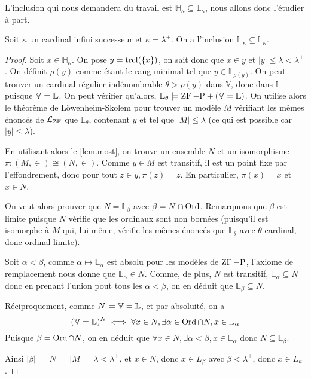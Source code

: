 L'inclusion qui nous demandera du travail est
$\mathbb H_\kappa \subseteq\mathbb L_\kappa$, nous allons donc l'étudier à part.

\begin{lemma}
  Soit $\kappa$ un cardinal infini successeur et $\kappa = \lambda^+$. On a
  l'inclusion $\mathbb H_\kappa \subseteq \mathbb L_\kappa$.
\end{lemma}

\begin{proof}
  Soit $x \in \mathbb H_\kappa$. On pose $y = \operatorname{trcl}(\{x\})$, on sait donc que
  $x \in y$ et $|y| \leq \lambda < \lambda^+$. On définit $\rho(y)$ comme étant
  le rang minimal tel que $y\in\mathbb L_{\rho(y)}$. On peut trouver un cardinal
  régulier indénombrable $\theta > \rho(y)$ dans $\mathbb V$, donc dans
  $\mathbb L$ puisque $\mathbb V = \mathbb L$. On peut vérifier qu'alors,
  $\mathbb L_{\theta}\models \operatorname{ZF} - \mathrm{P} + (\mathbb V = \mathbb L)$. On utilise alors le
  théorème de Löwenheim-Skolem pour trouver un modèle $M$ vérifiant les mêmes
  énoncés de $\mathcal L_{\operatorname{ZF}}$ que $\mathbb L_{\theta}$, contenant
  $y$ et tel que $|M| \leq \lambda$ (ce qui est possible car $|y|\leq \lambda$).

  En utilisant alors le \cref{lem.most}, on trouve un ensemble $N$ et un
  isomorphisme $\pi : (M,\in)\cong (N,\in)$. Comme $y\in M$ est transitif, il
  est un point fixe par l'effondrement, donc pour tout $z\in y, \pi(z) = z$. En
  particulier, $\pi(x) = x$ et $x\in N$.

  On veut alors prouver que $N = \mathbb L_\beta$ avec $\beta = N\cap \operatorname{Ord}$.
  Remarquons que $\beta$ est limite puisque $N$ vérifie que les ordinaux sont
  non bornées (puisqu'il est isomorphe à $M$ qui, lui-même, vérifie les mêmes
  énoncés que $\mathbb L_\theta$ avec $\theta$ cardinal, donc ordinal limite).

  Soit $\alpha < \beta$, comme $\alpha \mapsto \mathbb L_\alpha$ est absolu
  pour les modèles de $\operatorname{ZF} - \mathrm{P}$, l'axiome de remplacement nous donne
  que $\mathbb L_\alpha \in N$. Comme, de plus, $N$ est transitif,
  $\mathbb L_\alpha \subseteq N$ donc en prenant l'union pout tous les
  $\alpha < \beta$, on en déduit que $\mathbb L_\beta \subseteq N$.

  Réciproquement, comme $N\models \mathbb V = \mathbb L$, et par absoluité, on a
  \[(\mathbb V = \mathbb L)^N \iff \forall x \in N, \exists \alpha \in \operatorname{Ord}\cap N,
  x\in \mathbb L_\alpha\]
  Puisque $\beta = \operatorname{Ord} \cap N$, on en déduit que
  $\forall x \in N, \exists \alpha < \beta, x\in \mathbb L_\alpha$ donc
  $N\subseteq\mathbb L_\beta$.

  Ainsi $|\beta| = |N| = |M| = \lambda < \lambda^+$, et $x\in N$, donc
  $x\in L_\beta$ avec $\beta < \lambda^+$, donc $x\in L_\kappa$.
\end{proof}

